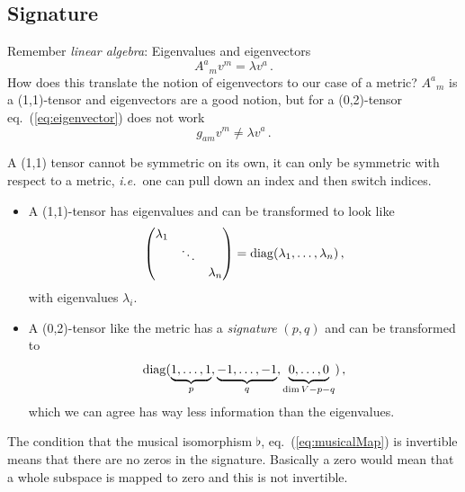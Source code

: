 \documentclass[11pt, a4paper, twocolumn]{article} %
\begin{document}
\subsection{Signature}
Remember \textit{linear algebra}:
Eigenvalues and eigenvectors
\begin{equation}
    A^a{}_m v^m = \lambda v^a\,.
    \label{eq:eigenvector}
\end{equation}
How does this translate the notion of eigenvectors to our case of a metric?
$A^a{}_m$ is a (1,1)-tensor and eigenvectors are a good notion,
but for a (0,2)-tensor eq.~(\ref{eq:eigenvector}) does not work
\begin{equation}
    g_{am}v^m \neq \lambda v^a\,.
\end{equation}
\begin{note}
    A (1,1) tensor cannot be symmetric on its own, it can only be symmetric
    with respect to a metric, \textit{i.e.}\ one can pull down an index
    and then switch indices.
\end{note}
\begin{itemize}
    \item A (1,1)-tensor has eigenvalues and can be transformed to look like
        \begin{equation}
            \begin{pmatrix}
                \lambda_1 & & \\
                & \ddots & \\
                & & \lambda_n
            \end{pmatrix} = \operatorname{diag}(\lambda_1, \ldots, \lambda_n)\,,
        \end{equation}
        with eigenvalues $\lambda_i$.
    \item A (0,2)-tensor like the metric has a \textit{signature} $(p,q)$ and can be transformed to
        \begin{equation}
            \operatorname{diag}(\underbrace{1,\dots, 1}_{p}, \underbrace{-1, \ldots, -1}_{q}, 
            \underbrace{0, \ldots, 0}_{\dim V - p - q})\,,
        \end{equation}
        which we can agree has way less information than the eigenvalues.
\end{itemize}
\begin{note}
    The condition that the musical isomorphism $\flat$, eq.~(\ref{eq:musicalMap})
    is invertible means that there are no zeros in the signature. 
    Basically a zero would mean that a whole subspace is mapped to zero and
    this is not invertible.
\end{note}
\end{document}
